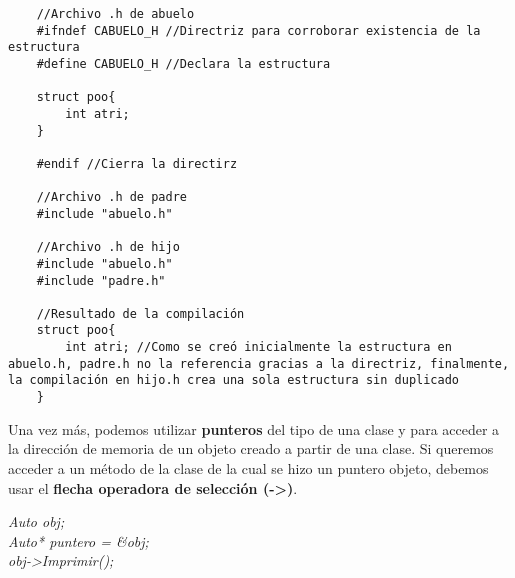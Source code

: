 \begin{lstlisting}
    //Archivo .h de abuelo
    #ifndef CABUELO_H //Directriz para corroborar existencia de la estructura
    #define CABUELO_H //Declara la estructura
    
    struct poo{
        int atri;
    }
    
    #endif //Cierra la directirz
    
    //Archivo .h de padre
    #include "abuelo.h"
    
    //Archivo .h de hijo
    #include "abuelo.h"
    #include "padre.h"
    
    //Resultado de la compilación
    struct poo{
        int atri; //Como se creó inicialmente la estructura en abuelo.h, padre.h no la referencia gracias a la directriz, finalmente, la compilación en hijo.h crea una sola estructura sin duplicado
    }
\end{lstlisting}
Una vez más, podemos utilizar \textbf{punteros} del tipo de una clase y para acceder a la dirección de memoria de un objeto creado a partir de una clase. Si queremos acceder a un método de la clase de la cual se hizo un puntero objeto, debemos usar  el \textbf{flecha operadora de selección (->)}.\begin{center}\textit{Auto obj;\\Auto* puntero = \&obj;\\obj->Imprimir();}\end{center}



